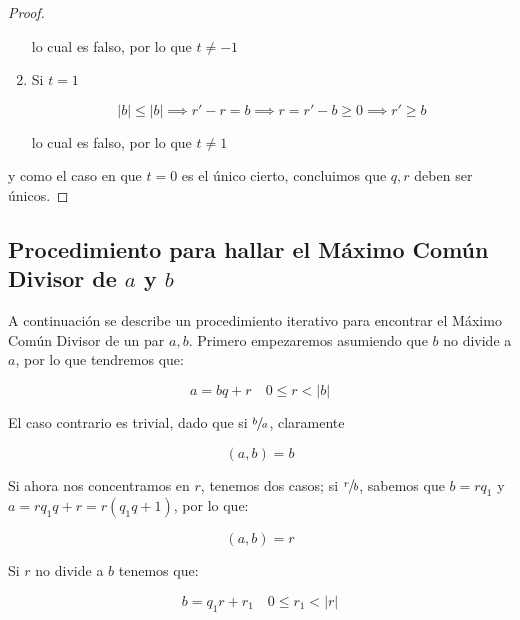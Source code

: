 \begin{proof}
\begin{enumerate}
                lo cual es falso, por lo que $t \ne -1$

                \item Si $t = 1$

                \begin{equation*}
                    |b| \leq |b| \implies r' - r = b \implies r = r' - b \geq 0 \implies r' \geq b
                \end{equation*}

                lo cual es falso, por lo que $t \ne 1$
            \end{enumerate}

            y como el caso en que $t = 0$ es el único cierto, concluimos que $q, r$ deben ser únicos.
        \end{proof}

    \subsection{Procedimiento para hallar el Máximo Común Divisor de $a$ y $b$}

        A continuación se describe un procedimiento iterativo para encontrar el Máximo Común Divisor de un par $a, b$.
        Primero empezaremos asumiendo que $b$ no divide a $a$, por lo que tendremos que:

        \begin{equation} \label{eq:mcd1}
            a = bq + r \quad 0 \leq r < |b|
        \end{equation}

        El caso contrario es trivial, dado que si $\sfrac{b}{a}$, claramente

        \begin{equation*}
            (a, b) = b
        \end{equation*}

        Si ahora nos concentramos en $r$, tenemos dos casos; si $\sfrac{r}{b}$, sabemos que $b = r q_1$ y $a = r q_1 q + r = r(q_1 q + 1)$, por lo que:

        \begin{equation*}
            (a, b) = r
        \end{equation*}

        Si $r$ no divide a $b$ tenemos que:

        \begin{equation} \label{eq:mcd2}
            b = q_1 r + r_1 \quad 0 \leq r_1 < |r|
        \end{equation}

